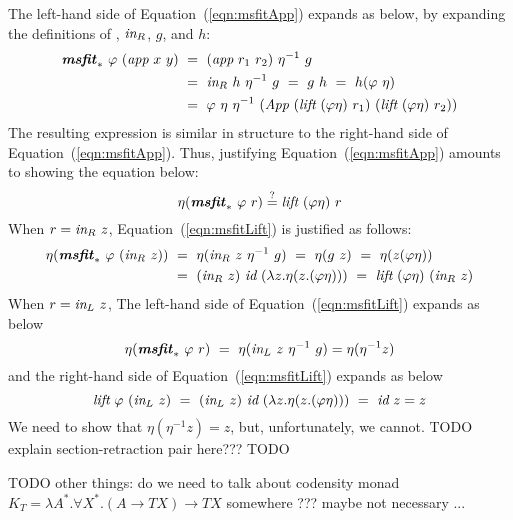 The left-hand side of Equation~(\ref{eqn:msfitApp}) expands as below,
by expanding the definitions of \msfit{*}, $\textit{in}_{R}$, $g$, and  $h$:
\begin{align*}
\textbf{\textit{msfit}}_{*}~\varphi~(\textit{app}~x~y)
&~=~ (\textit{app}~r_1~r_2)~\eta^{-1}~g \\
&~=~ \textit{in}_{R}~h~\eta^{-1}~g ~=~ g~h ~=~ h(\varphi~\eta) \\
&~=~ \varphi~\eta~\eta^{-1}
     ~(\textit{App}~(\textit{lift}~(\varphi\eta)~r_1)~(\textit{lift}~(\varphi\eta)~r_2))
\end{align*}
The resulting expression is similar in structure to the right-hand side of
Equation~(\ref{eqn:msfitApp}). Thus, justifying Equation~(\ref{eqn:msfitApp})
amounts to showing the equation below:
\begin{equation}
\eta(\textbf{\textit{msfit}}_{*}~\varphi~r) \stackrel{?}{=} \textit{lift}~(\varphi\eta)~r
\label{eqn:msfitLift}
\end{equation}
When $r = \textit{in}_{R}~z$, Equation~(\ref{eqn:msfitLift}) is justified as follows:
\begin{align*}
\eta(\textbf{\textit{msfit}}_{*}~\varphi~(\textit{in}_{R}~z))
&~=~ \eta(\textit{in}_{R}~z~\eta^{-1}~g) ~=~ \eta(g~z) ~=~ \eta(z(\varphi\eta)) \\
&~=~ (\textit{in}_{R}~z)~\textit{id}~(\lambda z.\eta(z.(\varphi\eta)))
 ~=~ \textit{lift}~(\varphi\eta)~(\textit{in}_{R}~z)
\end{align*}
When $r = \textit{in}_{L}~z$,
The left-hand side of Equation~(\ref{eqn:msfitLift}) expands as below
\[ \eta(\textbf{\textit{msfit}}_{*}~\varphi~r) ~=~\eta(\textit{in}_{L}~z~\eta^{-1}~g) = \eta(\eta^{-1}z)
\]
and the right-hand side of Equation~(\ref{eqn:msfitLift}) expands as below
\[ \textit{lift}~\varphi~(\textit{in}_{L}~z)
   ~=~ (\textit{in}_{L}~z)~\textit{id}~(\lambda z.\eta(z.(\varphi\eta)))
   ~=~ \textit{id}~z = z
\]
We need to show that $\eta(\eta^{-1}z) = z$, but, unfortunately, we cannot.
TODO explain section-retraction pair here??? TODO




TODO other things: do we need to talk about codensity monad
$K_T = \lambda A^{*}.\forall X^{*}.(A \to T X) \to T X$
somewhere ??? maybe not necessary ...


